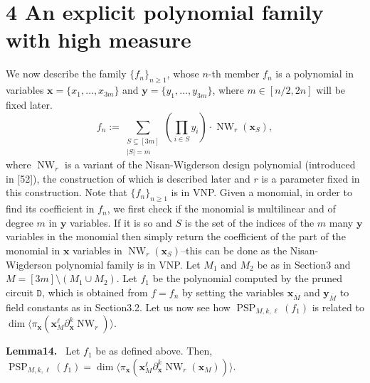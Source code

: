 \documentclass[10pt,a4paper]{article}
\newenvironment{authorclaim}[1]{\par\medskip\noindent\textbf{#1.}\ \ignorespaces}{\par\medskip}
\DeclareMathOperator{\PSP}{PSP}
\begin{document}
\section*{4 An explicit polynomial family with high measure}
We now describe the family $\{f_n\}_{n\ge1}$, whose $n$-th member $f_n$ is a polynomial in variables $\mathbf x=\{x_1,\ldots,x_{3m}\}$ and $\mathbf y=\{y_1,\ldots,y_{3m}\}$, where $m\in[n/2,2n]$ will be fixed later.
\[
f_n:=\sum_{\substack{S\subseteq[3m]\\|S|=m}}\left(\prod_{i\in S}y_i\right)\cdot\operatorname{NW}_r(\mathbf x_S),
\]
where $\operatorname{NW}_r$ is a variant of the Nisan-Wigderson design polynomial (introduced in [52]), the construction of which is described later and $r$ is a parameter fixed in this construction. Note that $\{f_n\}_{n\ge1}$ is in VNP. Given a monomial, in order to find its coefficient in $f_n$, we first check if the monomial is multilinear and of degree $m$ in $\mathbf y$ variables. If it is so and $S$ is the set of the indices of the $m$ many $\mathbf y$ variables in the monomial then simply return the coefficient of the part of the monomial in $\mathbf x$ variables in $\operatorname{NW}_r(\mathbf x_S)$--this can be done as the Nisan-Wigderson polynomial family is in VNP.
Let $M_1$ and $M_2$ be as in Section3 and $M=[3m]\setminus(M_1\cup M_2)$. Let $f_1$ be the polynomial computed by the pruned circuit $\mathtt D$, which is obtained from $f=f_n$ by setting the variables $\mathbf x_{\overline M}$ and $\mathbf y_{\overline M}$ to field constants as in Section3.2. Let us now see how $\PSP_{M,k,\ell}(f_1)$ is related to $\dim\langle\pi_{\mathbf x}(\mathbf x_M^\ell\partial_{\mathbf x}^k\operatorname{NW}_r)\rangle$.
\begin{authorclaim}{Lemma14}
Let $f_1$ be as defined above. Then,
$\PSP_{M,k,\ell}(f_1)=\dim\langle\pi_{\mathbf x}(\mathbf x_M^\ell\partial_{\mathbf x}^k\operatorname{NW}_r(\mathbf x_M))\rangle$.
\end{authorclaim}
\end{document}
